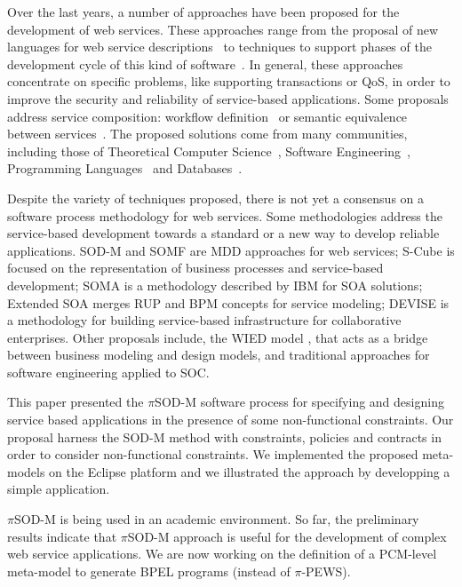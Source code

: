 Over the last years, a number of approaches have been proposed for the
development of web services. These approaches range from the proposal of new 
languages for web service descriptions~\cite{bpel03,SBS04} 
to techniques to support phases of the development cycle of this kind of
software~\cite{lipari2007}. In general, these
approaches concentrate on specific problems, like supporting transactions or
QoS, in order to improve the security and reliability of service-based
applications. Some proposals address service composition: workflow
definition~\cite{AalstHKB03,MuP06} or semantic equivalence between
services~\cite{BHM06}. The proposed solutions come from many communities, 
including those of Theoretical Computer Science~\cite{VA05,GGP08}, 
Software Engineering~\cite{Aal03,MendesPDB09}, Programming
Languages~\cite{MPC08,bpel03} and Databases~\cite{ABM01}.

Despite the variety of techniques proposed, there is not yet a consensus on a software
process methodology for web services. Some methodologies address the service-based 
development towards a standard or a new way to develop reliable applications. 
SOD-M and SOMF \cite{somf} are MDD approaches for web services; 
S-Cube \cite{scube2010book} is focused on the representation of business processes and 
service-based development; SOMA \cite{soma} is a methodology described by IBM
for SOA solutions; Extended SOA \cite{PapazoglouH06} merges RUP and
BPM\cite{bpm} concepts for service modeling; DEVISE \cite{DEVISE} is a
methodology for building service-based infrastructure for collaborative
enterprises. Other proposals include, the WIED model \cite{TongrungrojanaL04}, 
that acts as a bridge between business modeling and design models, and traditional 
approaches for software engineering \cite{sommerville08} applied to SOC. 

\bigskip

This paper presented the $\pi$SOD-M software process for specifying and designing service based applications in the presence of some non-functional constraints. 
Our proposal harness the SOD-M method with constraints, policies and contracts in order to consider non-functional constraints.
We implemented the proposed meta-models on the Eclipse platform and we illustrated the approach by developping a simple application.

$\pi$SOD-M is being used in an academic environment.
So far, the preliminary results indicate that $\pi$SOD-M approach is useful for the development of complex web service applications. 
We are now working on the definition of a PCM-level meta-model to generate BPEL programs (instead of $\pi$-PEWS). 
